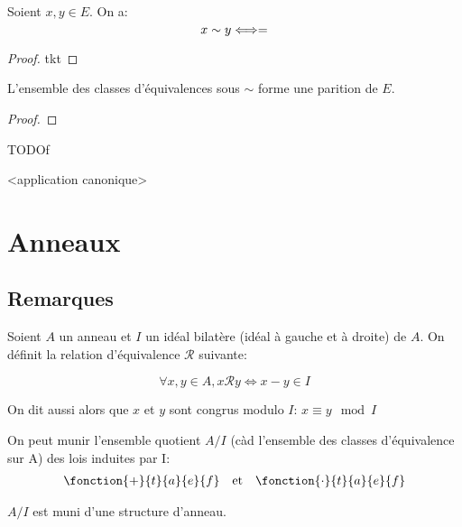\begin{lemma}
    Soient $x,y \in E$. On a:
    \[ x \sim y \Longleftrightarrow \title{x} = \title{y} \]
\end{lemma}

\begin{proof}
    tkt
\end{proof}

\begin{theorem}
    L'ensemble des classes d'équivalences sous $\sim$ forme une parition de $E$.
\end{theorem}

\begin{proof}
    
\end{proof}

\begin{definition}
    TODOf
\end{definition}

<application canonique>


\section{Anneaux}

\subsection{Remarques}

\begin{definition}
    Soient $A$ un anneau et $I$ un idéal bilatère (idéal à gauche et à droite) de $A$.
    On définit la relation d'équivalence $\mathscr{R}$ suivante:

    \[ \forall x, y \in A, x \mathscr{R} y \Longleftrightarrow x - y \in I \]

    On dit aussi alors que $x$ et $y$ sont congrus modulo $I$: $x \equiv y \mod I$

    On peut munir l'ensemble quotient $A/I$ (càd l'ensemble des classes d'équivalence sur A) des lois induites par I:
    \[ \begin{array}{lcr}
        \fonction{+}{t}{a}{e}{f} & \text{et} & \fonction{\cdot}{t}{a}{e}{f}
    \end{array} \]

    $A/I$ est muni d'une structure d'anneau.

\end{definition}

